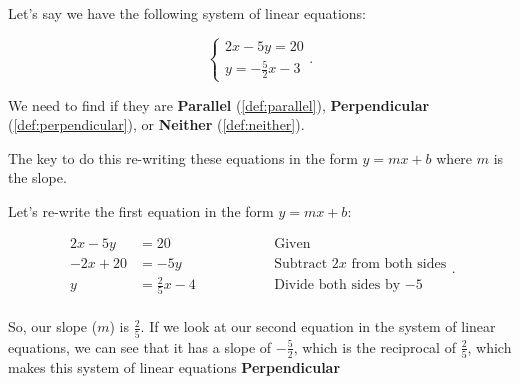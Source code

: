 \begin{example}
  \label{exm:identifying_if_an_equation_is_parallel_perpendicular_or_neither_2}

  Let's say we have the following system of linear equations:
  
  \begin{equation}
    \label{cse:system_of_linear_equations_2}
    \begin{cases}
      2x - 5y = 20 \\
      y = -\frac{5}{2}x - 3
    \end{cases}
  .\end{equation}
  
  We need to find if they are \textbf{Parallel} (\ref{def:parallel}),
  \textbf{Perpendicular} (\ref{def:perpendicular}), or \textbf{Neither}
  (\ref{def:neither}).
  
  The key to do this re-writing these equations in the form $y = mx + b$ where $m$
  is the slope.
  
  Let's re-write the first equation in the form $y = mx + b$:
  
  \begin{equation}
    \label{edt:re_writing_the_first_equation_in_the_form_y_mx_b_2}
    \begin{alignedat}{3}
      2x - 5y &= 20 \qquad\qquad && \textrm{Given} \\
      -2x + 20 &= -5y \qquad\qquad && \textrm{Subtract $2x$ from both sides} \\
      y &= \frac{2}{5}x - 4 \qquad\qquad && \textrm{Divide both sides by $-5$} \\
    \end{alignedat}
  .\end{equation}

  So, our slope ($m$) is $\frac{2}{5}$. If we look at our second equation in the
  system of linear equations, we can see that it has a slope of $-\frac{5}{2}$,
  which is the reciprocal of $\frac{2}{5}$, which makes this system of linear
  equations \textbf{Perpendicular}
\end{example}


